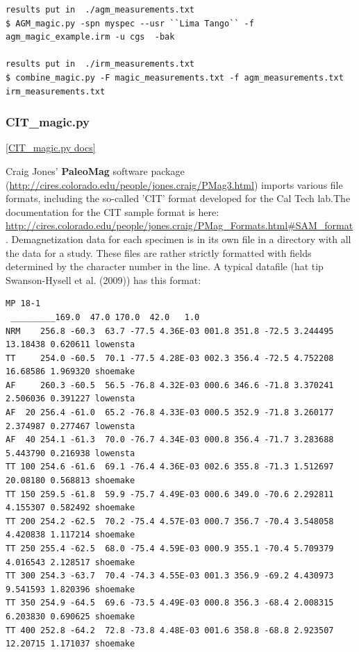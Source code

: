 \documentclass[11pt]{book}
\begin{document}
{{\begin{verbatim}
results put in  ./agm_measurements.txt
$ AGM_magic.py -spn myspec --usr ``Lima Tango`` -f agm_magic_example.irm -u cgs  -bak

results put in  ./irm_measurements.txt
$ combine_magic.py -F magic_measurements.txt -f agm_measurements.txt irm_measurements.txt

\end{verbatim}




\subsubsection{CIT\_magic.py}
\href{https://github.com/PmagPy/PmagPy/blob/master/programs/CIT_magic.py}{[CIT\_magic.py docs]}

 Craig Jones' {\bf PaleoMag} software package (\url{http://cires.colorado.edu/people/jones.craig/PMag3.html}) imports various file formats, including the so-called 'CIT' format developed for the  Cal Tech lab.The documentation for the CIT sample format is here: \url{http://cires.colorado.edu/people/jones.craig/PMag_Formats.html#SAM_format}.
 Demagnetization data for each specimen is in its own file in a directory with all the data for a study.
These files are rather strictly formatted with fields determined by the character number in the line.   A typical datafile (hat tip Swanson-Hysell et al. (2009)) \nocite{swansonhysell09} has this format:

\begin{verbatim}
MP 18-1
 _________169.0  47.0 170.0  42.0   1.0
NRM    256.8 -60.3  63.7 -77.5 4.36E-03 001.8 351.8 -72.5 3.244495 13.18438 0.620611 lowensta
TT     254.0 -60.5  70.1 -77.5 4.28E-03 002.3 356.4 -72.5 4.752208 16.68586 1.969320 shoemake
AF     260.3 -60.5  56.5 -76.8 4.32E-03 000.6 346.6 -71.8 3.370241 2.506036 0.391227 lowensta
AF  20 256.4 -61.0  65.2 -76.8 4.33E-03 000.5 352.9 -71.8 3.260177 2.374987 0.277467 lowensta
AF  40 254.1 -61.3  70.0 -76.7 4.34E-03 000.8 356.4 -71.7 3.283688 5.443790 0.216938 lowensta
TT 100 254.6 -61.6  69.1 -76.4 4.36E-03 002.6 355.8 -71.3 1.512697 20.08180 0.568813 shoemake
TT 150 259.5 -61.8  59.9 -75.7 4.49E-03 000.6 349.0 -70.6 2.292811 4.155307 0.582492 shoemake
TT 200 254.2 -62.5  70.2 -75.4 4.57E-03 000.7 356.7 -70.4 3.548058 4.420838 1.117214 shoemake
TT 250 255.4 -62.5  68.0 -75.4 4.59E-03 000.9 355.1 -70.4 5.709379 4.016543 2.128517 shoemake
TT 300 254.3 -63.7  70.4 -74.3 4.55E-03 001.3 356.9 -69.2 4.430973 9.541593 1.820396 shoemake
TT 350 254.9 -64.5  69.6 -73.5 4.49E-03 000.8 356.3 -68.4 2.008315 6.203830 0.690625 shoemake
TT 400 252.8 -64.2  72.8 -73.8 4.48E-03 001.6 358.8 -68.8 2.923507 12.20715 1.171037 shoemake
\end{verbatim}

}}
\end{document}
